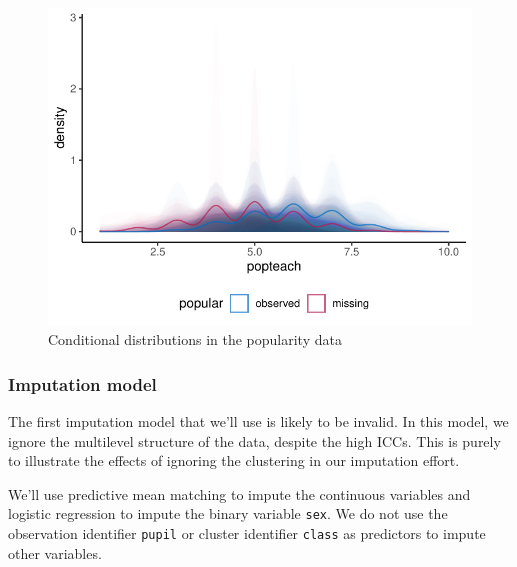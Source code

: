 \documentclass[
]{jss}
\begin{document}
\begin{CodeChunk}
\begin{figure}

{\centering \includegraphics{Manuscript_files/figure-latex/pop_dist-1} 

}

\caption[Conditional distributions in the popularity data]{Conditional distributions in the popularity data}\label{fig:pop_dist}
\end{figure}
\end{CodeChunk}

\hypertarget{imputation-model}{%
\subsubsection{Imputation model}\label{imputation-model}}

The first imputation model that we'll use is likely to be invalid. In
this model, we ignore the multilevel structure of the data, despite the
high ICCs. This is purely to illustrate the effects of ignoring the
clustering in our imputation effort.

We'll use predictive mean matching to impute the continuous variables
and logistic regression to impute the binary variable \texttt{sex}. We
do not use the observation identifier \texttt{pupil} or cluster
identifier \texttt{class} as predictors to impute other variables.

\begin{CodeChunk}
\end{CodeChunk}
\end{document}
